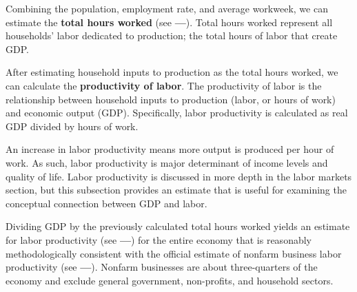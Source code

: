 \documentclass{report}
\begin{document}
\begin{minipage}{0.76\textwidth} 
\small Combining the population, employment rate, and average workweek, we can estimate the \textbf{total hours worked} (see {\color{orange}\textbf{---}}). Total hours worked represent all households' labor dedicated to production; the total hours of labor that create GDP. 
\end{minipage}
\newpage
\begin{minipage}{0.76\textwidth}
 
\small After estimating household inputs to production as the total hours worked, we can calculate the \textbf{productivity of labor}. The productivity of labor is the relationship between household inputs to production (labor, or hours of work) and economic output (GDP). Specifically, labor productivity is calculated as real GDP divided by hours of work. 

An increase in labor productivity means more output is produced per hour of work. As such, labor productivity is major determinant of income levels and quality of life. Labor productivity is discussed in more depth in the labor markets section, but this subsection provides an estimate that is useful for examining the conceptual connection between GDP and labor.

Dividing GDP by the previously calculated total hours worked yields an estimate for labor productivity (see {\color{cyan!60!white}\textbf{---}}) for the entire economy that is reasonably methodologically consistent with the official estimate of nonfarm business labor productivity (see {\color{violet}\textbf{---}}). Nonfarm businesses are about three-quarters of the economy and exclude general government, non-profits, and household sectors. 
\end{minipage}
\vspace{1mm}
\end{document}
